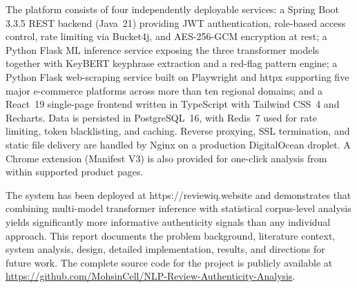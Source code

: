 \documentclass[12pt,a4paper,oneside]{report}
\newif\iffrontmatterlist
\renewcommand{\texttt}[1]{%
  {\ttfamily\hyphenchar\font=45\relax #1}}
\begin{document}
The platform consists of four independently deployable services: a Spring Boot
3.3.5 REST backend (Java~21) providing JWT authentication, role-based access
control, rate limiting via Bucket4j, and AES-256-GCM encryption at rest; a
Python Flask ML inference service exposing the three transformer models
together with KeyBERT keyphrase extraction and a red-flag pattern engine; a
Python Flask web-scraping service built on Playwright and \texttt{httpx}
supporting five major e-commerce platforms across more than ten regional
domains; and a React~19 single-page frontend written in TypeScript with
Tailwind CSS~4 and Recharts. Data is persisted in PostgreSQL~16, with Redis~7
used for rate limiting, token blacklisting, and caching. Reverse proxying,
SSL termination, and static file delivery are handled by Nginx on a
production DigitalOcean droplet. A Chrome extension (Manifest V3) is also
provided for one-click analysis from within supported product pages.

The system has been deployed at \texttt{https://reviewiq.website} and
demonstrates that combining multi-model transformer inference with
statistical corpus-level analysis yields significantly more informative
authenticity signals than any individual approach. This report documents the
problem background, literature context, system analysis, design, detailed
implementation, results, and directions for future work. The complete source
code for the project is publicly available at
\url{https://github.com/MohsinCell/NLP-Review-Authenticity-Analysis}.

\renewcommand{\contentsname}{Table of Contents}
\clearpage
\frontmatterlisttrue      %
\pagestyle{romanplain}
\tableofcontents

\clearpage
\pagestyle{romanplain}
\listoffigures
{}

\clearpage
\pagestyle{romanplain}
\listoftables
{}
\clearpage
\frontmatterlistfalse     %

\clearpage
{}
\pagestyle{hbfancy}

\end{document}
